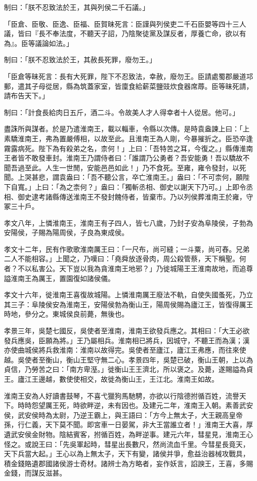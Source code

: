\begin{pinyinscope}
制曰：「朕不忍致法於王，其與列侯二千石議。」

「臣倉、臣敬、臣逸、臣福、臣賀昧死言：臣謹與列侯吏二千石臣嬰等四十三人議，皆曰『長不奉法度，不聽天子詔，乃陰聚徒黨及謀反者，厚養亡命，欲以有為』。臣等議論如法。」

制曰：「朕不忍致法於王，其赦長死罪，廢勿王。」

「臣倉等昧死言：長有大死罪，陛下不忍致法，幸赦，廢勿王。臣請處蜀郡嚴道邛郵，遣其子母從居，縣為筑蓋家室，皆廩食給薪菜鹽豉炊食器席蓐。臣等昧死請，請布告天下。」

制曰：「計食長給肉日五斤，酒二斗。令故美人才人得幸者十人從居。他可。」

盡誅所與謀者。於是乃遣淮南王，載以輜車，令縣以次傳。是時袁盎諫上曰：「上素驕淮南王，弗為置嚴傅相，以故至此。且淮南王為人剛，今暴摧折之。臣恐卒逢霧露病死。陛下為有殺弟之名，柰何！」上曰：「吾特苦之耳，今復之。」縣傳淮南王者皆不敢發車封。淮南王乃謂侍者曰：「誰謂乃公勇者？吾安能勇！吾以驕故不聞吾過至此。人生一世閒，安能邑邑如此！」乃不食死。至雍，雍令發封，以死聞。上哭甚悲，謂袁盎曰：「吾不聽公言，卒亡淮南王。」盎曰：「不可柰何，願陛下自寬。」上曰：「為之柰何？」盎曰：「獨斬丞相、御史以謝天下乃可。」上即令丞相、御史逮考諸縣傳送淮南王不發封餽侍者，皆棄市。乃以列侯葬淮南王於雍，守冢三十戶。

孝文八年，上憐淮南王，淮南王有子四人，皆七八歲，乃封子安為阜陵侯，子勃為安陽侯，子賜為陽周侯，子良為東成侯。

孝文十二年，民有作歌歌淮南厲王曰：「一尺布，尚可縫；一斗粟，尚可舂。兄弟二人不能相容。」上聞之，乃嘆曰：「堯舜放逐骨肉，周公殺管蔡，天下稱聖。何者？不以私害公。天下豈以我為貪淮南王地邪？」乃徙城陽王王淮南故地，而追尊謚淮南王為厲王，置園復如諸侯儀。

孝文十六年，徙淮南王喜復故城陽。上憐淮南厲王廢法不軌，自使失國蚤死，乃立其三子：阜陵侯安為淮南王，安陽侯勃為衡山王，陽周侯賜為廬江王，皆復得厲王時地，參分之。東城侯良前薨，無後也。

孝景三年，吳楚七國反，吳使者至淮南，淮南王欲發兵應之。其相曰：「大王必欲發兵應吳，臣願為將。」王乃屬相兵。淮南相已將兵，因城守，不聽王而為漢；漢亦使曲城侯將兵救淮南：淮南以故得完。吳使者至廬江，廬江王弗應，而往來使越。吳使者至衡山，衡山王堅守無二心。孝景四年，吳楚已破，衡山王朝，上以為貞信，乃勞苦之曰：「南方卑溼。」徙衡山王王濟北，所以褒之。及薨，遂賜謚為貞王。廬江王邊越，數使使相交，故徙為衡山王，王江北。淮南王如故。

淮南王安為人好讀書鼓琴，不喜弋獵狗馬馳騁，亦欲以行陰德拊循百姓，流譽天下。時時怨望厲王死，時欲畔逆，未有因也。及建元二年，淮南王入朝。素善武安侯，武安侯時為太尉，乃逆王霸上，與王語曰：「方今上無太子，大王親高皇帝孫，行仁義，天下莫不聞。即宮車一日晏駕，非大王當誰立者！」淮南王大喜，厚遺武安侯金財物。陰結賓客，拊循百姓，為畔逆事。建元六年，彗星見，淮南王心怪之。或說王曰：「先吳軍起時，彗星出長數尺，然尚流血千里。今彗星長竟天，天下兵當大起。」王心以為上無太子，天下有變，諸侯并爭，愈益治器械攻戰具，積金錢賂遺郡國諸侯游士奇材。諸辨士為方略者，妄作妖言，諂諛王，王喜，多賜金錢，而謀反滋甚。


\end{pinyinscope}
